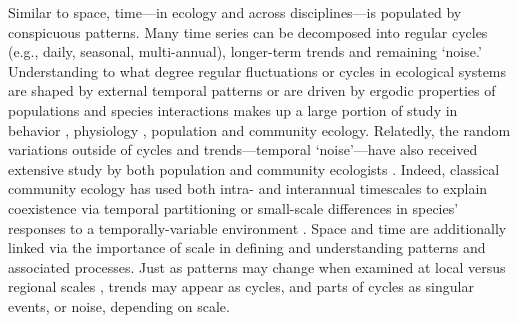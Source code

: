 \documentclass[11pt,a4paper,oneside]{article}
\begin{document}
Similar to space, time---in ecology and across disciplines---is populated by conspicuous patterns. Many time series can be decomposed into regular cycles (e.g., daily, seasonal, multi-annual), longer-term trends and remaining `noise.'  Understanding to what degree regular fluctuations or cycles in ecological systems are shaped by external temporal patterns or are driven by ergodic properties of populations and species interactions makes up a large portion of study in behavior \citep{macarthur1958}, physiology \citep{Lambers:2008jb}, population  \citep{May1976,Yang:2004zd} and community \citep{Chesson:1997dz} ecology.  Relatedly, the random variations outside of cycles and trends---temporal `noise'---have also received extensive study by both population \citep{Kaitala1997,Bjornstad:1999kl} and community ecologists \citep{Chesson:1997dz}. Indeed, classical community ecology has used both intra- \citep{Albrecht:2001id} and interannual \citep{Chesson:1997dz} timescales to explain coexistence via temporal partitioning or small-scale differences in species' responses to a temporally-variable environment \citep{macarthur1958,Hutchinson:1961ui}. Space and time are additionally linked via the importance of scale in defining and understanding patterns and associated processes. Just as patterns may change when examined at local versus regional scales \citep[e.g.,][]{Fridley:2007ct}, trends may appear as cycles, and parts of cycles as singular events, or noise, depending on scale. 
\end{document}
